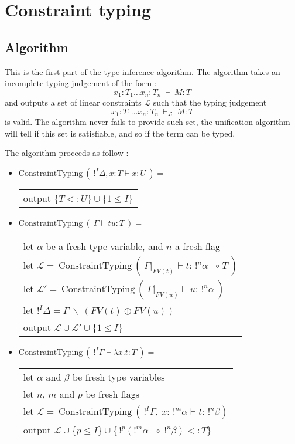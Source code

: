 \documentclass[10pt]{article}
\theoremstyle{plain}
\theoremstyle{definition}
\begin{document}
\section{Constraint typing}

\subsection{Algorithm}

	This is the first part of the type inference algorithm.
	The algorithm takes an incomplete typing judgement of the form :
		$$x_1 : T_1 \dots x_n : T_n ~ \vdash ~ M : T$$
	and outputs a set of linear constraints $\mathcal{L}$ such that the typing judgement
	  $$x_1 : T_1 \dots x_n : T_n ~ \vdash_{\mathcal{L}} ~ M : T$$
	is valid. The algorithm never fails to provide such set, the unification algorithm will tell if this
	set is satisfiable, and so if the term can be typed.
	
	The algorithm proceeds as follow :
	\begin{itemize}
		\item $\text{ConstraintTyping} ~ (~ !^I \Delta, x : T \vdash x : U ~) = $ \\
		  \begin{tabular}{l}
				output $\{ T <: U \} \cup \{ 1 \le I \}$
		  \end{tabular}
		\item $\text{ConstraintTyping} ~ (~ \Gamma \vdash t u : T ~) = $ \\
			\begin{tabular}{l}
				let $\alpha$ be a fresh type variable, and $n$ a fresh flag \\
				let $\mathcal{L} = ~ \text{ConstraintTyping} ~ (~ \Gamma|_{FV(t)} \vdash t : \, !^n\alpha \multimap T ~)$ \\
				let $\mathcal{L'} = ~ \text{ConstraintTyping} ~ ( ~ \Gamma|_{FV(u)} \vdash u : \, !^n\alpha ~)$ \\
				let $!^I\Delta = \Gamma ~ \backslash ~ (FV(t) \oplus FV(u))$ \\
				output $\mathcal{L \cup L'} \cup \{ 1 \le I \}$
			\end{tabular}
		\item $\text{ConstraintTyping} ~ (~ !^I \Gamma \vdash \lambda x.t : T ~) = $ \\
			\begin{tabular}{l}
				let $\alpha$ and $\beta$ be fresh type variables \\
				let $n$, $m$ and $p$ be fresh flags \\
				let $\mathcal{L} = ~ \text{ConstraintTyping} ~ ( \, !^I \Gamma, ~ x : \, !^m \alpha \vdash  t : \, !^n\beta)$ \\
				output $\mathcal{L} \cup \{ p \le I \} \cup \{ \, !^p (!^m \alpha \multimap \, !^n \beta) <: T\}$
			\end{tabular}
	\end{itemize}
	
\end{document}

